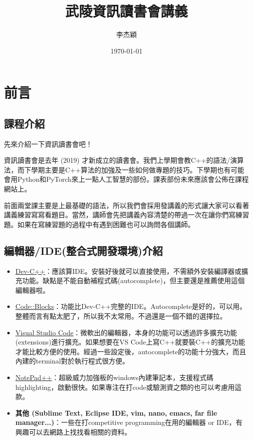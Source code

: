 \documentclass[a4paper, 11pt, oneside]{book}
\title{武陵資訊讀書會講義}
\author{李杰穎}
\date{\today}
\begin{document}
\maketitle
\tableofcontents

\chapter{前言}
\section{課程介紹}
先來介紹一下資訊讀書會吧！

資訊讀書會是去年 (2019) 才新成立的讀書會。我們上學期會教C++的語法/演算法，而下學期主要是C++算法的加強及一些如何做專題的技巧。下學期也有可能會用Python和PyTorch來上一點人工智慧的部份。課表部份未來應該會公佈在課程網站上。

前面兩堂課主要是上最基礎的語法，所以我們會採用發講義的形式讓大家可以看著講義練習寫寫看題目。當然，講師會先把講義內容清楚的帶過一次在讓你們寫練習題。如果在寫練習題的過程中有遇到困難也可以詢問各個講師。

\section{編輯器/IDE(整合式開發環境)介紹}
\begin{itemize}
    \item \href{https://sourceforge.net/projects/orwelldevcpp/}{\underline{Dev-C++}}：應該算IDE。安裝好後就可以直接使用，不需額外安裝編譯器或擴充功能。缺點是不能自動補程式碼(autocomplete)，但主要還是推薦使用這個編輯器啦。
    \item \href{https://sourceforge.net/projects/codeblocks/files/Binaries/20.03/Windows/codeblocks-20.03-setup.exe/download}{\underline{Code::Blocks}}：功能比Dev-C++完整的IDE。Autocomplete是好的，可以用。整體而言有點太肥了，所以我不太常用。不過還是一個不錯的選擇拉。
    \item \href{https://code.visualstudio.com/}{\underline{Visual Studio Code}}：微軟出的編輯器，本身的功能可以透過許多擴充功能(extensions)進行擴充。如果想要在VS Code上寫C++就要裝C++的擴充功能才能比較方便的使用。經過一些設定後，autocomplete的功能十分強大，而且內建的terminal對於執行程式很方便。
    \item \href{https://notepad-plus-plus.org/}{\underline{NotePad++}}：超級威力加強板的windows內建筆記本，支援程式碼highlighting，啟動很快。如果專注在打code或驗測資之類的也可以考慮用這款。
    \item \textbf{其他 (Sublime Text, Eclipse IDE, vim, nano, emacs, far file manager...)}：一些在打competitive programming在用的編輯器 or IDE，有興趣可以去網路上找找看相關的資料。
\end{itemize}
\end{document}
